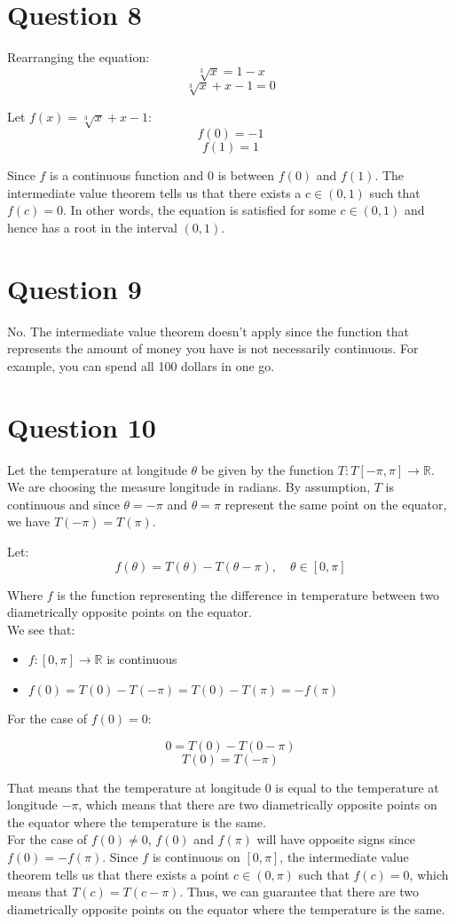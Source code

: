 \documentclass[11pt]{article}
\begin{document}
\section{Question 8}
\label{sec:org3c533aa}
Rearranging the equation:
\[\sqrt[3]{x} = 1 - x\]
\[\sqrt[3]{x} + x - 1 = 0\]

Let \(f(x) = \sqrt[3]{x} + x - 1\):
\[f(0) = -1\]
\[f(1) = 1\]

Since \(f\) is a continuous function and \(0\) is between \(f(0)\) and \(f(1)\). The intermediate value theorem tells us that there exists a \(c \in (0, 1)\) such that \(f(c) = 0\). In other words, the equation is satisfied for some \(c \in (0, 1)\) and hence has a root in the interval \((0, 1)\).

\section{Question 9}
\label{sec:orge559b75}
No. The intermediate value theorem doesn't apply since the function that represents the amount of money you have is not necessarily continuous. For example, you can spend all 100 dollars in one go.


\section{Question 10}
\label{sec:org8b54b23}
Let the temperature at longitude \(\theta\) be given by the function \(T: T [-\pi, \pi] \rightarrow \mathbb{R}\). We are choosing the measure longitude in radians. By assumption, \(T\) is continuous and since \(\theta = - \pi\) and \(\theta = \pi\) represent the same point on the equator, we have \(T(-\pi) = T(\pi)\).

Let:
\[f(\theta) = T(\theta) - T(\theta - \pi), \quad \theta \in [0, \pi]\]

Where \(f\) is the function representing the difference in temperature between two diametrically opposite points on the equator.
\\[0pt]

We see that:
\begin{itemize}
\item \(f: [0, \pi] \rightarrow \mathbb{R}\) is continuous
\item \(f(0) = T(0) - T(-\pi) = T(0) - T(\pi) = -f(\pi)\)
\end{itemize}

For the case of \(f(0) = 0\):

\[0 = T(0) - T(0 - \pi)\]
\[T(0) = T(-\pi)\]

That means that the temperature at longitude \(0\) is equal to the temperature at longitude \(-\pi\), which means that there are two diametrically opposite points on the equator where the temperature is the same.
\\[0pt]

For the case of \(f(0) \neq 0\), \(f(0)\) and \(f(\pi)\) will have opposite signs since \(f(0) = -f(\pi)\). Since \(f\) is continuous on \([0, \pi]\), the intermediate value theorem tells us that there exists a point \(c \in (0, \pi)\) such that \(f(c) = 0\), which means that \(T(c) = T(c - \pi)\). Thus, we can guarantee that there are two diametrically opposite points on the equator where the temperature is the same.
\end{document}
